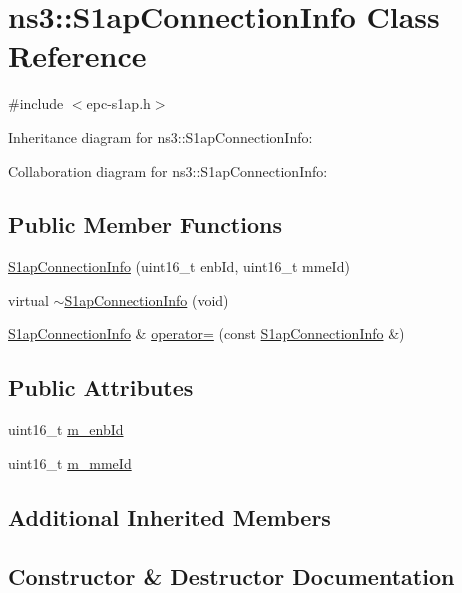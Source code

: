 \hypertarget{classns3_1_1S1apConnectionInfo}{}\section{ns3\+:\+:S1ap\+Connection\+Info Class Reference}
\label{classns3_1_1S1apConnectionInfo}


{\ttfamily \#include $<$epc-\/s1ap.\+h$>$}



Inheritance diagram for ns3\+:\+:S1ap\+Connection\+Info\+:


Collaboration diagram for ns3\+:\+:S1ap\+Connection\+Info\+:
\subsection*{Public Member Functions}
\begin{DoxyCompactItemize}
\item 
\hyperlink{classns3_1_1S1apConnectionInfo_a7e711cf06c8c8c8b8317bdb10b831bb5}{S1ap\+Connection\+Info} (uint16\+\_\+t enb\+Id, uint16\+\_\+t mme\+Id)
\item 
virtual \hyperlink{classns3_1_1S1apConnectionInfo_ab746f9922ecbdd5196c0d2ab11f94f22}{$\sim$\+S1ap\+Connection\+Info} (void)
\item 
\hyperlink{classns3_1_1S1apConnectionInfo}{S1ap\+Connection\+Info} \& \hyperlink{classns3_1_1S1apConnectionInfo_a6de895a7eeba51490921124c84fbb9c1}{operator=} (const \hyperlink{classns3_1_1S1apConnectionInfo}{S1ap\+Connection\+Info} \&)
\end{DoxyCompactItemize}
\subsection*{Public Attributes}
\begin{DoxyCompactItemize}
\item 
uint16\+\_\+t \hyperlink{classns3_1_1S1apConnectionInfo_a9e93ffda997f5843813a83ca8f37d75d}{m\+\_\+enb\+Id}
\item 
uint16\+\_\+t \hyperlink{classns3_1_1S1apConnectionInfo_a886b38983459e8939f5e0fe983512415}{m\+\_\+mme\+Id}
\end{DoxyCompactItemize}
\subsection*{Additional Inherited Members}


\subsection{Constructor \& Destructor Documentation}
